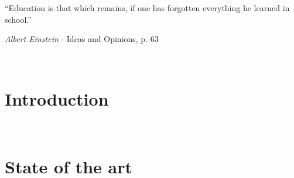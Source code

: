 

\usepackage[
    backend=biber, style=authortitle, defernumbers=true, backref=true, block=none, hyperref=true
]{biblatex}

\setlength{}




\pagestyle{empty}
\newpage \ \newpage


\newpage \ \newpage

\renewcommand{\epigraphsize}{\large}
\renewcommand{\epigraphwidth}{10cm}
\vspace{3cm}
\epigraph{``Education is that which remains, if one has forgotten everything he learned in school.''}{\textit{Albert Einstein} - Ideas and Opinions, p. 63}
\newpage \ \newpage

%


\vspace{-1cm}
\setcounter{tocdepth}{3}
\tableofcontents
\newpage %
\listoffigures
\newpage %
{}
\renewcommand\lstlistlistingname{List of Sample codes/Examples}
\lstlistoflistings

\makeatletter
\@openleftfalse
\makeatother
\pagestyle{fancy}
\part{Introduction}
\label{part:introduction}


\newpage \thispagestyle{empty} \ \newpage
\part{State of the art}
\label{part:state-of-the-art}


\newpage \thispagestyle{empty} \ \newpage
